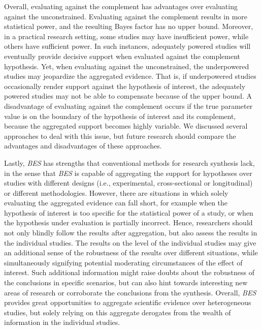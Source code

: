\documentclass[review, 3p, authoryear]{elsarticle} %
\begin{document}
Overall, evaluating against the complement has advantages over evaluating against the unconstrained.
Evaluating against the complement results in more statistical power, and the resulting Bayes factor has no upper bound.
Moreover, in a practical research setting, some studies may have insufficient power, while others have sufficient power.
In such instances, adequately powered studies will eventually provide decisive support when evaluated against the complement hypothesis.
Yet, when evaluating against the unconstrained, the underpowered studies may jeopardize the aggregated evidence.
That is, if underpowered studies occasionally render support against the hypothesis of interest, the adequately powered studies may not be able to compensate because of the upper bound.
A disadvantage of evaluating against the complement occurs if the true parameter value is on the boundary of the hypothesis of interest and its complement, because the aggregated support becomes highly variable.
We discussed several approaches to deal with this issue, but future research should compare the advantages and disadvantages of these approaches.

Lastly, \emph{BES} has strengths that conventional methods for research synthesis lack, in the sense that \emph{BES} is capable of aggregating the support for hypotheses over studies with different designs (i.e., experimental, cross-sectional or longitudinal) or different methodologies.
However, there are situations in which solely evaluating the aggregated evidence can fall short, for example when the hypothesis of interest is too specific for the statistical power of a study, or when the hypothesis under evaluation is partially incorrect.
Hence, researchers should not only blindly follow the results after aggregation, but also assess the results in the individual studies.
The results on the level of the individual studies may give an additional sense of the robustness of the results over different situations, while simultaneously signifying potential moderating circumstances of the effect of interest.
Such additional information might raise doubts about the robustness of the conclusions in specific scenarios, but can also hint towards interesting new areas of research or corroborate the conclusions from the synthesis.
Overall, \emph{BES} provides great opportunities to aggregate scientific evidence over heterogeneous studies, but solely relying on this aggregate derogates from the wealth of information in the individual studies.


\end{document}

